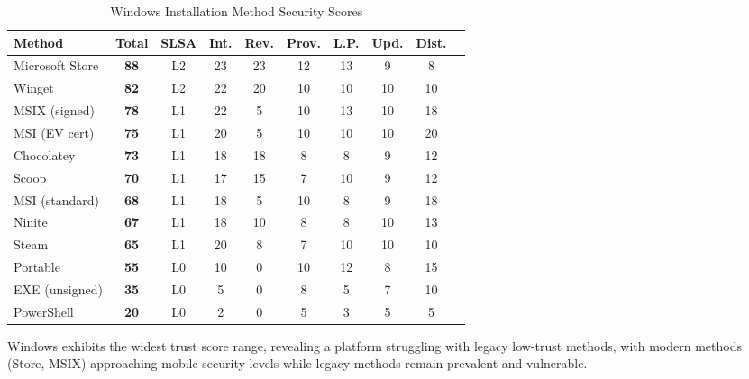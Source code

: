 \documentclass[11pt,a4paper]{article}
\begin{document}
\begin{table}[h]
\centering
\caption{Windows Installation Method Security Scores}
\begin{tabular}{lccccccccc}
\toprule
\textbf{Method} & \textbf{Total} & \textbf{SLSA} & \textbf{Int.} & \textbf{Rev.} & \textbf{Prov.} & \textbf{L.P.} & \textbf{Upd.} & \textbf{Dist.} \\
\midrule
Microsoft Store & \textbf{88} & L2 & 23 & 23 & 12 & 13 & 9 & 8 \\
Winget & \textbf{82} & L2 & 22 & 20 & 10 & 10 & 10 & 10 \\
MSIX (signed) & \textbf{78} & L1 & 22 & 5 & 10 & 13 & 10 & 18 \\
MSI (EV cert) & \textbf{75} & L1 & 20 & 5 & 10 & 10 & 10 & 20 \\
Chocolatey & \textbf{73} & L1 & 18 & 18 & 8 & 8 & 9 & 12 \\
Scoop & \textbf{70} & L1 & 17 & 15 & 7 & 10 & 9 & 12 \\
MSI (standard) & \textbf{68} & L1 & 18 & 5 & 10 & 8 & 9 & 18 \\
Ninite & \textbf{67} & L1 & 18 & 10 & 8 & 8 & 10 & 13 \\
Steam & \textbf{65} & L1 & 20 & 8 & 7 & 10 & 10 & 10 \\
Portable & \textbf{55} & L0 & 10 & 0 & 10 & 12 & 8 & 15 \\
EXE (unsigned) & \textbf{35} & L0 & 5 & 0 & 8 & 5 & 7 & 10 \\
PowerShell & \textbf{20} & L0 & 2 & 0 & 5 & 3 & 5 & 5 \\
\bottomrule
\end{tabular}
\end{table}

Windows exhibits the widest trust score range, revealing a platform struggling with legacy low-trust methods, with modern methods (Store, MSIX) approaching mobile security levels while legacy methods remain prevalent and vulnerable.
\end{document}
